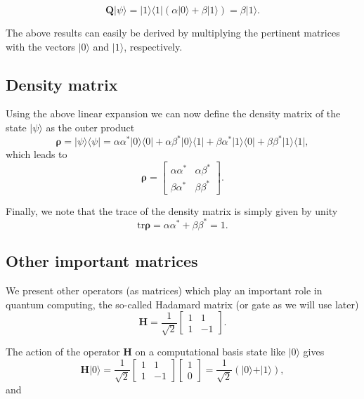 \[
\bm{Q}\vert \psi \rangle = \vert 1 \rangle\langle 1\vert (\alpha \vert 0 \rangle + \beta\vert 1 \rangle)=\beta \vert 1\rangle.
\]

The above results can easily be derived by multiplying the pertinent
matrices with the vectors $\vert 0\rangle$ and $\vert 1\rangle$,
respectively.

\subsection{Density matrix}

Using the above linear expansion we can now define the density matrix of the state $\vert \psi\rangle$ as the outer product
\[
\bm{\rho}=\vert \psi \rangle\langle \psi \vert = \alpha\alpha^* \vert 0 \rangle\langle 0\vert+\alpha\beta^* \vert 0 \rangle\langle 1\vert+\beta\alpha^* \vert 1 \rangle\langle 0\vert+\beta\beta^* \vert 1 \rangle\langle 1\vert,
\]
which leads to
\[
\bm{\rho}=\begin{bmatrix} \alpha\alpha^* & \alpha\beta^*\\ \beta\alpha^* & \beta\beta^*\end{bmatrix}.
\]

Finally, we note that the trace of the density matrix is simply given by unity
\[
\mathrm{tr}\bm{\rho}=\alpha\alpha^* +\beta\beta^*=1.
\]

\subsection{Other important matrices}

We present other operators (as matrices) which play an important role in quantum computing, the so-called Hadamard matrix (or gate as we will use later)
\[
\bm{H}=\frac{1}{\sqrt{2}}\begin{bmatrix} 1 & 1 \\ 1 & -1\end{bmatrix}.
\]

The action of the operator $\bm{H}$ on a computational basis state like $\vert 0\rangle$ gives
\[
\bm{H}\vert 0 \rangle = \frac{1}{\sqrt{2}}\begin{bmatrix} 1 & 1 \\ 1 & -1\end{bmatrix}\begin{bmatrix} 1 \\ 0\end{bmatrix}=\frac{1}{\sqrt{2}}(\vert 0\rangle + \vert 1\rangle),
\]
and 

